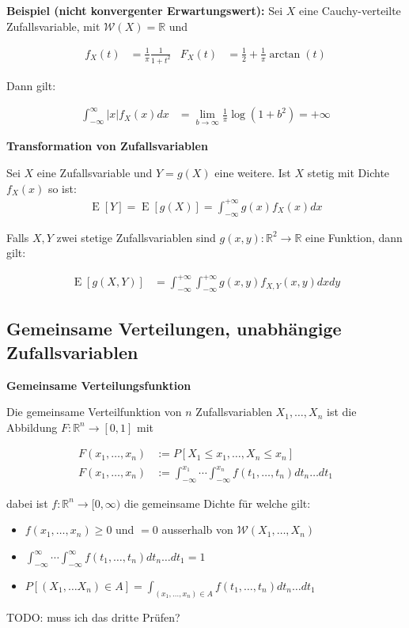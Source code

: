 \documentclass[25pt]{sciposter}
\newcommand{\R}{\mathbb{R}}
\newcommand{\W}{\mathcal{W}}
\newcommand{\E}{\operatorname{E}}
\newenvironment{method}[1]{\begin{mdframed}[backgroundcolor=blue!10,innertopmargin=15pt, innerbottommargin=15pt,nobreak=true]
		\textbf{#1 }
	}
	{ 
	\end{mdframed}
}
\newenvironment{thm}[1]{\begin{mdframed}[backgroundcolor=pink!50,innertopmargin=15pt, innerbottommargin=15pt, nobreak=true]
		\textbf{#1 }
	}
	{ 
	\end{mdframed}
}
\begin{document}
\begin{multicols}{3}
\textbf{Beispiel (nicht konvergenter Erwartungswert):}
Sei $X$ eine Cauchy-verteilte Zufallsvariable, mit $\W(X) = \R$ und

\begin{align*}
f_X(t) &= \frac{1}{\pi} \frac{1}{1+t^2}
& 
F_X(t) &= \frac{1}{2} + \frac{1}{\pi}\arctan(t)
\end{align*}

Dann gilt:

\begin{align*}
	\int_{-\infty}^\infty |x|f_X(x) dx &= \lim\limits_{b\to\infty} \frac{1}{\pi}\log(1+b^2) = +\infty
\end{align*}



\begin{thm}{Transformation von Zufallsvariablen}
	Sei $X$ eine Zufallsvariable und $Y=g(X)$ eine weitere. Ist $X$ stetig mit Dichte $f_X(x)$ so ist:
	\begin{align*}
		\E[Y] = \E[g(X)] = \int_{-\infty}^{+\infty} g(x) f_X(x) dx
	\end{align*}
	
	Falls $X,Y$ zwei stetige Zufallsvariablen sind $g(x,y) : \R^2 \to \R$ eine Funktion, dann gilt:
	
	\begin{align*}
		\E[g(X,Y)] &= \int_{-\infty}^{+\infty} \int_{-\infty}^{+\infty} g(x,y) f_{X,Y}(x,y) dx dy
	\end{align*}
	
\end{thm}



\subsection*{Gemeinsame Verteilungen, unabhängige Zufallsvariablen}


\begin{method}{Gemeinsame Verteilungsfunktion}
	Die gemeinsame Verteilfunktion von $n$ Zufallsvariablen $X_1,\ldots, X_n$ ist die Abbildung $F:\R^n \to [0,1]$ mit
	
	\begin{align*}
		F(x_1,\ldots,x_n) &:= P[X_1 \leq x_1, \ldots , X_n \leq x_n]\\
		F(x_1,\ldots,x_n) &:= \int_{-\infty}^{x_1}\cdots \int_{-\infty}^{x_n}f(t_1,\ldots,t_n)dt_n\ldots dt_1
	\end{align*}
	
	dabei ist $f:\R^n \to [0,\infty)$ die gemeinsame Dichte für welche gilt:
	\begin{itemize}
		\item $f(x_1,\ldots,x_n)\geq 0$ und $=0$ ausserhalb von $\W(X_1,\ldots,X_n)$
		\item $\int_{-\infty}^{\infty}\cdots \int_{-\infty}^{\infty}f(t_1,\ldots,t_n)dt_n\ldots dt_1 = 1$
		\item $P[(X_1,\ldots X_n)\in A] = \int_{(x_1,\ldots,x_n)\in A}f(t_1,\ldots,t_n)dt_n\ldots dt_1$
	\end{itemize} 
TODO: muss ich das dritte Prüfen?
\end{method}


\end{multicols}
\end{document}
